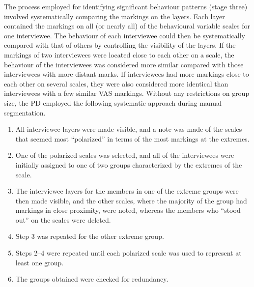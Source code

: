The process employed for identifying significant behaviour patterns (stage three) involved systematically comparing the markings on the layers. Each layer contained the markings on all (or nearly all) of the behavioural variable scales for one interviewee. The behaviour of each interviewee could then be systematically compared with that of others by controlling the visibility of the layers. If the markings of two interviewees were located close to each other on a scale, the behaviour of the interviewees was considered more similar compared with those interviewees with more distant marks. If interviewees had more markings close to each other on several scales, they were also considered more identical than interviewees with a few similar VAS markings. Without any restrictions on group size, the PD employed the following systematic approach during manual segmentation.
\begin{enumerate}
\item All interviewee layers were made visible, and a note was made of the scales that seemed most ``polarized'' in terms of the most markings at the extremes.
\item One of the polarized scales was selected, and all of the interviewees were initially assigned to one of two groups characterized by the extremes of the scale.
\item The interviewee layers for the members in one of the extreme groups were then made visible, and the other scales, where the majority of the group had markings in close proximity, were noted, whereas the members who ``stood out'' on the scales were deleted.
\item Step 3 was repeated for the other extreme group.
\item Steps 2--4 were repeated until each polarized scale was used to represent at least one group.
\item The groups obtained were checked for redundancy.
\end{enumerate}

